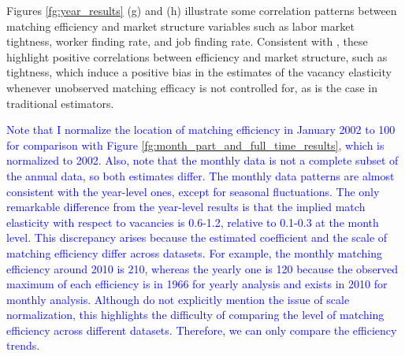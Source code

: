 \documentclass[12pt]{article}
\begin{document}
Figures \ref{fg:year_results} (g) and (h) illustrate some correlation patterns between matching efficiency and market structure variables such as labor market tightness, worker finding rate, and job finding rate. Consistent with \cite{lange2020beyond}, these highlight positive correlations between efficiency and market structure, such as tightness, which induce a positive bias in the estimates of the vacancy elasticity whenever unobserved matching efficacy is not controlled for, as is the case in traditional estimators.


\textcolor{blue}{Note that I normalize the location of matching efficiency in January 2002 to 100 for comparison with Figure \ref{fg:month_part_and_full_time_results}, which is normalized to 2002.
Also, note that the monthly data is not a complete subset of the annual data, so both estimates differ. 
The monthly data patterns are almost consistent with the year-level ones, except for seasonal fluctuations. The only remarkable difference from the year-level results is that the implied match elasticity with respect to vacancies is 0.6-1.2, relative to 0.1-0.3 at the month level. This discrepancy arises because the estimated coefficient and the scale of matching efficiency differ across datasets. 
For example, the monthly matching efficiency around 2010 is 210, whereas the yearly one is 120 because the observed maximum of each efficiency is in 1966 for yearly analysis and exists in 2010 for monthly analysis.
Although \cite{lange2020beyond} do not explicitly mention the issue of scale normalization, this highlights the difficulty of comparing the level of matching efficiency across different datasets. Therefore, we can only compare the efficiency trends.}
\end{document}
